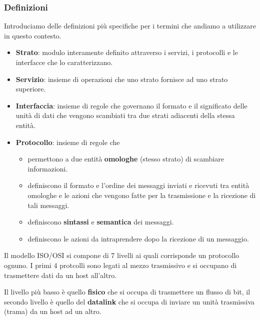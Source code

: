 \subsubsection{Definizioni}
Introduciamo delle definizioni più specifiche per i termini che andiamo a utilizzare in questo 
contesto.
\begin{itemize}
	\item \textbf{Strato}: modulo interamente definito attraverso i servizi, i protocolli e le 
		interfacce che lo caratterizzano.
	\item \textbf{Servizio}: insieme di operazioni che uno strato fornisce ad uno strato superiore.
	\item \textbf{Interfaccia}: insieme di regole che governano il formato e il significato delle 
		unità di dati che vengono scambiati tra due strati adiacenti della stessa entità.
	\item \textbf{Protocollo}: insieme di regole che
		\begin{itemize}
			\item permettono a due entità \textbf{omologhe} (stesso strato) di scambiare
				informazioni.
			\item definiscono il formato e l'ordine dei messaggi inviati e ricevuti tra entità
				omologhe e le azioni che vengono fatte per la trasmissione e la ricezione di 
				tali messaggi.
			\item definiscono \textbf{sintassi} e \textbf{semantica} dei messaggi.
			\item definiscono le azioni da intraprendere dopo la ricezione di un messaggio.
		\end{itemize}
\end{itemize}
Il modello ISO/OSI si compone di 7 livelli ai quali corrisponde un protocollo ognuno. I primi 4
protcolli sono legati al mezzo trasmissivo e si occupano di trasmettere dati da un host all'altro.

Il livello più basso è quello \textbf{fisico} che si occupa di trasmettere un flusso di bit, il 
secondo livello è quello del \textbf{datalink} che si occupa di inviare un unità trasmissiva
(trama) da un host ad un altro.
